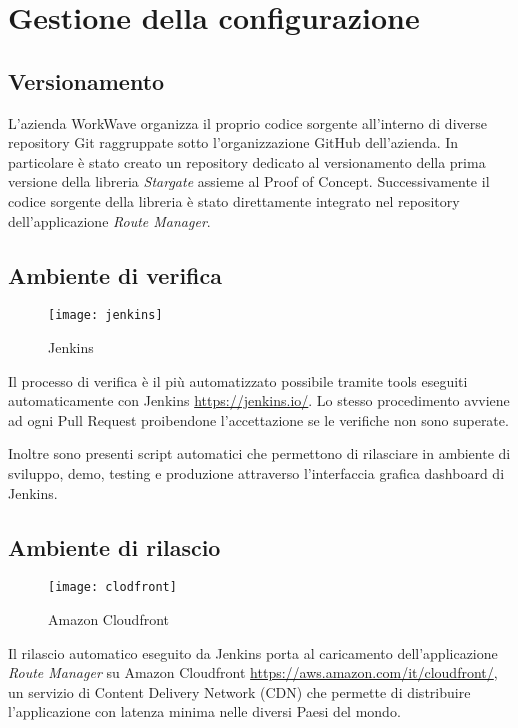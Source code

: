 \section{Gestione della configurazione}

\subsection{Versionamento}

L'azienda WorkWave organizza il proprio codice sorgente all'interno di diverse repository Git raggruppate sotto l'organizzazione GitHub dell'azienda. In particolare è stato creato un repository dedicato al versionamento della prima versione della libreria \textit{Stargate} assieme al Proof of Concept. Successivamente il codice sorgente della libreria è stato direttamente integrato nel repository dell'applicazione \textit{Route Manager}.

\subsection{Ambiente di verifica}

\begin{figure}[H] 
  \centering 
  \texttt{[image: jenkins]} 
  \caption{Jenkins}
\end{figure}

Il processo di verifica è il più automatizzato possibile tramite tools eseguiti automaticamente con Jenkins \url{https://jenkins.io/}. Lo stesso procedimento avviene ad ogni Pull Request proibendone l’accettazione se le verifiche non sono superate.

Inoltre sono presenti script automatici che permettono di rilasciare in ambiente di sviluppo, demo, testing e produzione attraverso l'interfaccia grafica dashboard di Jenkins.

\subsection{Ambiente di rilascio}

\begin{figure}[H] 
  \centering 
  \texttt{[image: clodfront]} 
  \caption{Amazon Cloudfront}
\end{figure}

Il rilascio automatico eseguito da Jenkins porta al caricamento dell'applicazione \textit{Route Manager} su Amazon Cloudfront \url{https://aws.amazon.com/it/cloudfront/}, un servizio di Content Delivery Network (CDN) che permette di distribuire l'applicazione con latenza minima nelle diversi Paesi del mondo.


